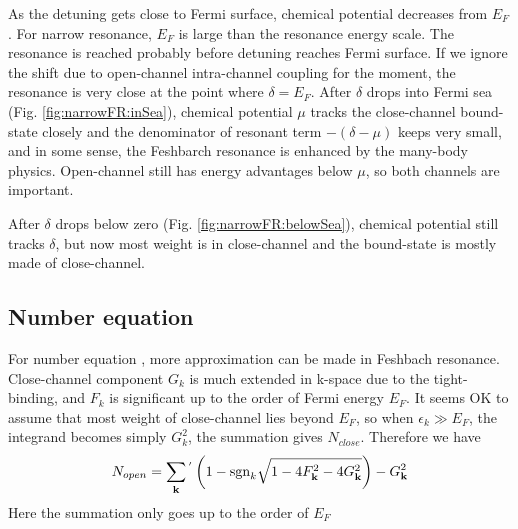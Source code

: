 As the detuning gets close to Fermi surface, chemical potential decreases from $E_{F}$. For narrow resonance, $E_{F}$ is large than the resonance energy scale.  The resonance is reached probably before detuning reaches Fermi surface.  If we ignore the shift due to open-channel intra-channel coupling for the moment, the resonance is very close at the point where $\delta=E_{F}$.  After $\delta$ drops into Fermi sea (Fig. \ref{fig:narrowFR:inSea}), chemical potential $\mu$ tracks the close-channel bound-state closely and the denominator of resonant term $-(\delta-\mu)$ keeps very small, and in some sense, the Feshbarch resonance is enhanced by the many-body  physics.  Open-channel still has energy advantages below $\mu$, so both channels are important.  

After $\delta$ drops below zero (Fig. \ref{fig:narrowFR:belowSea}), chemical potential still tracks $\delta$, but now most weight is in close-channel and the bound-state is mostly made of close-channel.  

\subsection{Number equation}
For number equation , more approximation can be made in Feshbach resonance.  Close-channel component $G_{k}$ is much extended in k-space due to the tight-binding, and $F_{k}$ is significant up to the order of Fermi energy $E_{F}$.  It seems OK to assume that most weight of close-channel lies beyond $E_{F}$, so when $\epsilon_{k}\gg{E_{F}}$, the integrand becomes simply $G_{k}^{2}$, the summation gives $N_{close}$.  Therefore we have 
\begin{equation}\label{eq:20101004:number}
N_{open}=\sum_{\mathbf{k}}{}^{'}\left(1-\text{sgn}_{k}\sqrt{1-4 F_{\mathbf{k}}^2-4 G_{\mathbf{k}}^2}\right)-G_{\mathbf{k}}^{2}
\end{equation} 
Here the summation only goes up to the order of $E_{F}$

